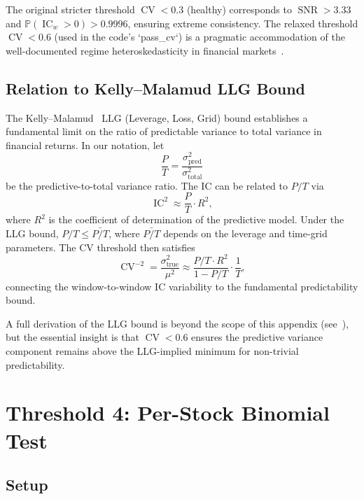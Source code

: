 \documentclass[11pt,a4paper]{article}
\theoremstyle{definition}
\newcommand{\IC}{\operatorname{IC}}
\newcommand{\CV}{\operatorname{CV}}
\newcommand{\Prob}{\mathbb{P}}
\newcommand{\SNR}{\operatorname{SNR}}
\begin{document}
The original stricter threshold $\CV < 0.3$ (healthy) corresponds to
$\SNR > 3.33$ and $\Prob(\IC_w > 0) > 0.9996$, ensuring extreme consistency.
The relaxed threshold $\CV < 0.6$ (used in the code's `pass\_cv`) is a
pragmatic accommodation of the well-documented regime heteroskedasticity in
financial markets~\cite{moreira2019}.

\subsection{Relation to Kelly--Malamud LLG Bound}

The Kelly--Malamud~\cite{kelly2013} LLG (Leverage, Loss, Grid) bound
establishes a fundamental limit on the ratio of predictable variance to
total variance in financial returns.  In our notation, let
\begin{equation}
    \frac{P}{T} = \frac{\sigma_{\text{pred}}^2}{\sigma_{\text{total}}^2}
\end{equation}
be the predictive-to-total variance ratio.  The IC can be related to $P/T$
via
\begin{equation}
    \IC^2 \approx \frac{P}{T} \cdot R^2,
\end{equation}
where $R^2$ is the coefficient of determination of the predictive model.
Under the LLG bound, $P/T \leq \bar{P/T}$, where $\bar{P/T}$ depends on the
leverage and time-grid parameters.  The CV threshold then satisfies
\begin{equation}
    \CV^{-2} = \frac{\sigma_{\text{true}}^2}{\mu^2}
             \approx \frac{P/T \cdot R^2}{1 - P/T} \cdot \frac{1}{T},
\end{equation}
connecting the window-to-window IC variability to the fundamental
predictability bound.

A full derivation of the LLG bound is beyond the scope of this appendix
(see~\cite{kelly2013}), but the essential insight is that $\CV < 0.6$
ensures the predictive variance component remains above the LLG-implied
minimum for non-trivial predictability.

\section{Threshold 4: Per-Stock Binomial Test}

\subsection{Setup}
\end{document}
